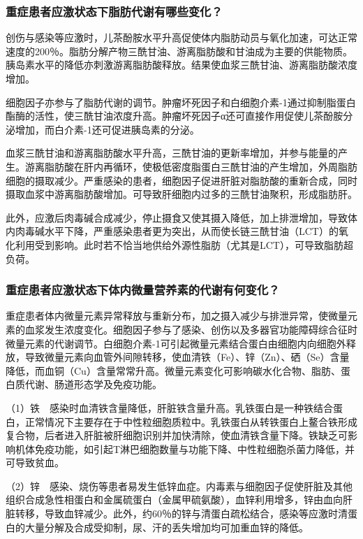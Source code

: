 \subsubsection{重症患者应激状态下脂肪代谢有哪些变化？}

创伤与感染等应激时，儿茶酚胺水平升高促使体内脂肪动员与氧化加速，可达正常速度的200％。脂肪分解产物三酰甘油、游离脂肪酸和甘油成为主要的供能物质。胰岛素水平的降低亦刺激游离脂肪酸释放。结果使血浆三酰甘油、游离脂肪酸浓度增加。

细胞因子亦参与了脂肪代谢的调节。肿瘤坏死因子和白细胞介素-1通过抑制脂蛋白酯酶的活性，使三酰甘油浓度升高。肿瘤坏死因子α还可直接作用促使儿茶酚胺分泌增加，而白介素-1还可促进胰岛素的分泌。

血浆三酰甘油和游离脂肪酸水平升高，三酰甘油的更新率增加，并参与能量的产生。游离脂肪酸在肝内再循环，使极低密度脂蛋白三酰甘油的产生增加，外周脂肪细胞的摄取减少。严重感染的患者，细胞因子促进肝脏对脂肪酸的重新合成，同时摄取血浆中游离脂肪酸增加。可导致肝细胞内过多的三酰甘油聚积，形成脂肪肝。

此外，应激后肉毒碱合成减少，停止摄食又使其摄入降低，加上排泄增加，导致体内肉毒碱水平下降，严重感染患者更为突出，从而使长链三酰甘油（LCT）的氧化利用受到影响。此时若不恰当地供给外源性脂肪（尤其是LCT），可导致脂肪超负荷。

\subsubsection{重症患者应激状态下体内微量营养素的代谢有何变化？}

重症患者体内微量元素异常释放与重新分布，加之摄入减少与排泄异常，使微量元素的血浆发生浓度变化。细胞因子参与了感染、创伤以及多器官功能障碍综合征时微量元素的代谢调节。白细胞介素-1可引起微量元素结合蛋白由细胞内向细胞外释放，导致微量元素向血管外间隙转移，使血清铁（Fe）、锌（Zn）、硒（Se）含量降低，而血铜（Cu）含量常常升高。微量元素变化可影响碳水化合物、脂肪、蛋白质代谢、肠道形态学及免疫功能。

（1）铁　感染时血清铁含量降低，肝脏铁含量升高。乳铁蛋白是一种铁结合蛋白，正常情况下主要存在于中性粒细胞质粒中。乳铁蛋白从转铁蛋白上鳌合铁形成复合物，后者进入肝脏被肝细胞识别并加快清除，使血清铁含量下降。铁缺乏可影响机体免疫功能，如引起T淋巴细胞数量与功能下降、中性粒细胞杀菌力降低，并可导致贫血。

（2）锌　感染、烧伤等患者易发生低锌血症。内毒素与细胞因子促使肝脏及其他组织合成急性相蛋白和金属硫蛋白（金属甲硫氨酸），血锌利用增多，锌由血向肝脏转移，导致血锌减少。此外，约60％的锌与清蛋白疏松结合，感染等应激时清蛋白的大量分解及合成受抑制，尿、汗的丢失增加均可加重血锌的降低。

